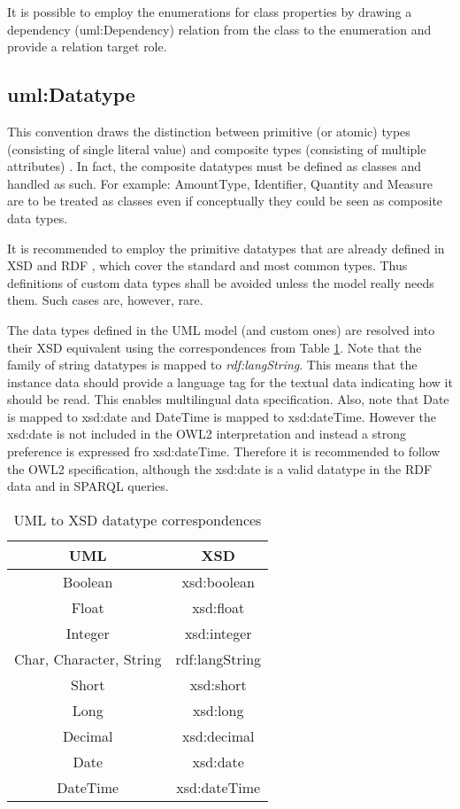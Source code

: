 	It is possible to employ the enumerations for class properties by drawing a dependency (uml:Dependency) relation from the class to the
	enumeration and provide a relation target role.
	

	\subsection{uml:Datatype}
	\label{sec:datatype}
	
	This convention draws the distinction between primitive (or atomic) types (consisting of single literal value) and composite types (consisting of multiple attributes) \citep{isaHandbook2015}. In fact, the composite datatypes must be defined as classes and handled as such. For example: AmountType, Identifier, Quantity and Measure are to be treated as classes even if conceptually they could be seen as composite data types.
	
	It is recommended to employ the primitive datatypes that are already defined in XSD \cite{xsd1.1-spec} and RDF \cite{rdf11}, which cover the standard and most common types. Thus definitions of custom data types shall be avoided unless the model really needs them. Such cases are, however, rare.
	
	The data types defined in the UML model (and custom ones) are resolved into their XSD equivalent using the correspondences from Table \ref{tab:uml2xsd}. Note that the family of string datatypes is mapped to \textit{rdf:langString}. This means that the instance data should provide a language tag for the textual data indicating how it should be read. This enables multilingual data specification. Also, note that Date is mapped to xsd:date and DateTime is mapped to xsd:dateTime. However the xsd:date is not included in the OWL2 interpretation and instead a strong preference is expressed fro xsd:dateTime. Therefore it is recommended to follow the OWL2 specification, although the xsd:date is a valid datatype in the RDF data and in SPARQL queries. 
	
	\begin{table}[!ht]
		\caption{UML to XSD datatype correspondences}
		\label{tab:uml2xsd}
		\centering
		\begin{tabular}{@{}cc@{}}
			\toprule
			UML                     & XSD         \\ \midrule
			Boolean                 & xsd:boolean \\
			Float                   & xsd:float   \\
			Integer                 & xsd:integer \\
			Char, Character, String & rdf:langString  \\
			Short                   & xsd:short   \\
			Long                    & xsd:long    \\
			Decimal                 & xsd:decimal \\
			Date                    & xsd:date    \\ 
			DateTime                & xsd:dateTime \\ \bottomrule
		\end{tabular}
	\end{table}

